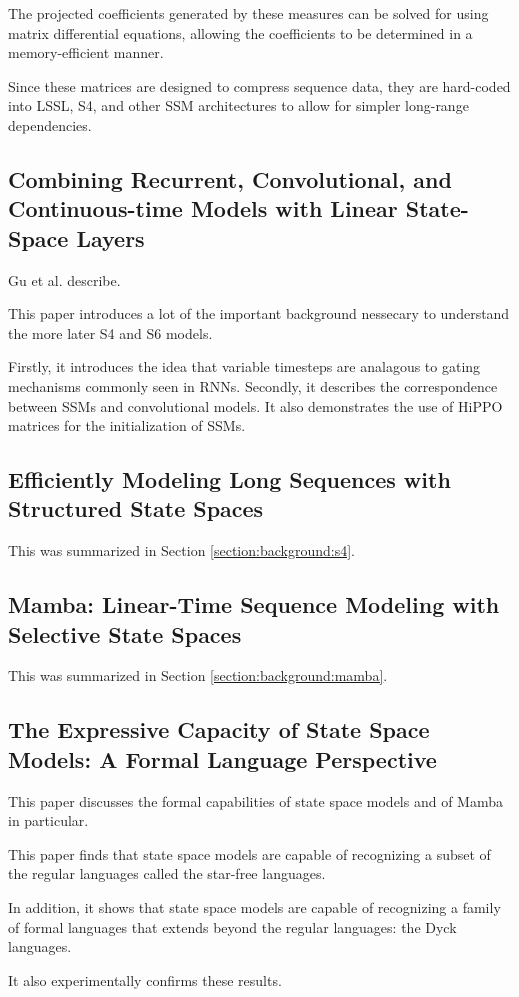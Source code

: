 The projected coefficients generated by these measures can be solved for using
matrix differential equations, allowing the coefficients to be determined in
a memory-efficient manner.

Since these matrices are designed to compress sequence data, they are hard-coded
into LSSL, S4, and other SSM architectures to allow for simpler long-range
dependencies.

\subsection{Combining Recurrent, Convolutional, and Continuous-time Models with
Linear State-Space Layers}
Gu et al. describe\cite{lssl}.

This paper introduces a lot of the important background nessecary to understand
the more later S4 and S6 models.

Firstly, it introduces the idea that variable timesteps are analagous to gating
mechanisms commonly seen in RNNs.
Secondly, it describes the correspondence between SSMs and convolutional models.
It also demonstrates the use of HiPPO matrices for the initialization of SSMs.

\subsection{Efficiently Modeling Long Sequences with Structured State Spaces}
This was summarized in Section \ref{section:background:s4}.

\subsection{Mamba: Linear-Time Sequence Modeling with Selective State Spaces}
This was summarized in Section \ref{section:background:mamba}.

\subsection{The Expressive Capacity of State Space Models: A Formal Language
Perspective}
This paper discusses the formal capabilities of state space models and of Mamba
in particular\cite{ssmformal}.

This paper finds that state space models are capable of recognizing a subset of
the regular languages called the star-free languages.

In addition, it shows that state space models are capable of recognizing a
family of formal languages that extends beyond the regular languages: the Dyck
languages.

It also experimentally confirms these results.
